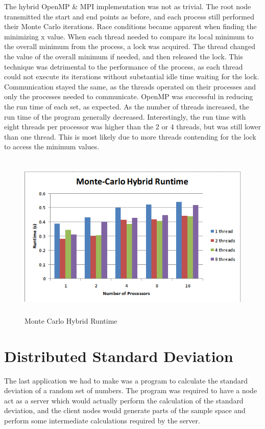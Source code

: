 \documentclass[notitlepage, letterpaper, 12pt]{report}
\begin{document}
The hybrid OpenMP \& MPI implementation was not as trivial.  The root node transmitted the start and end points as before, and each process still performed their Monte Carlo iterations.  Race conditions became apparent when finding the minimizing x value.  When each thread needed to compare its local minimum to the overall minimum from the process, a lock was acquired.  The thread changed the value of the overall minimum if needed, and then released the lock.  This technique was detrimental to the performance of the process, as each thread could not execute its iterations without substantial idle time waiting for the lock.  Communication stayed the same, as the threads operated on their processes and only the processes needed to communicate.  OpenMP was successful in reducing the run time of each set, as expected.  As the number of threads increased, the run time of the program generally decreased.  Interestingly, the run time with eight threads per processor was higher than the 2 or 4 threads, but was still lower than one thread.  This is most likely due to more threads contending for the lock to access the minimum values.

\begin{figure}[H]
	\includegraphics[width=\linewidth,height=8cm,keepaspectratio]{q2-hybrid.png}
	\caption[Monte Carlo Hybrid Runtime]{Monte Carlo Hybrid Runtime}
	\label{fig:arch}
\end{figure}

\section*{Distributed Standard Deviation}

The last application we had to make was a program to calculate the standard deviation of a random set of numbers.
The program was required to have a node act as a server which would actually perform the calculation of the standard deviation, and the
client nodes would generate parts of the sample space and perform some intermediate calculations required by the server. 
\end{document}
